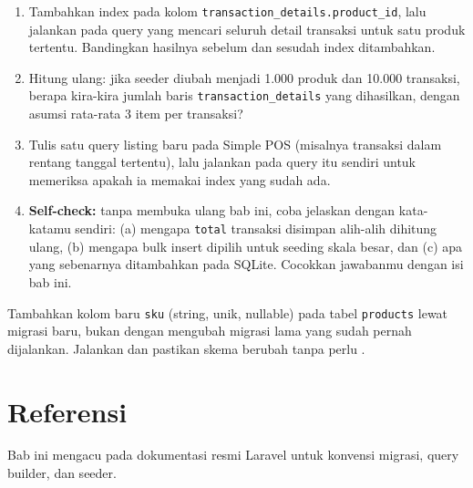 \begin{enumerate}
  \item Tambahkan index pada kolom \texttt{transaction\_details.product\_id},
    lalu jalankan  pada query yang mencari
    seluruh detail transaksi untuk satu produk tertentu. Bandingkan
    hasilnya sebelum dan sesudah index ditambahkan.
  \item Hitung ulang: jika seeder diubah menjadi 1.000 produk dan
    10.000 transaksi, berapa kira-kira jumlah baris
    \texttt{transaction\_details} yang dihasilkan, dengan asumsi
    rata-rata 3 item per transaksi?
  \item Tulis satu query listing baru pada Simple POS (misalnya
    transaksi dalam rentang tanggal tertentu), lalu jalankan
     pada query itu sendiri untuk memeriksa
    apakah ia memakai index yang sudah ada.
  \item \textbf{Self-check:} tanpa membuka ulang bab ini, coba jelaskan
    dengan kata-katamu sendiri: (a) mengapa \texttt{total} transaksi
    disimpan alih-alih dihitung ulang, (b) mengapa bulk insert dipilih
    untuk seeding skala besar, dan (c) apa yang sebenarnya ditambahkan
     pada SQLite. Cocokkan jawabanmu dengan isi bab
    ini.
\end{enumerate}

\begin{challengebox}
Tambahkan kolom baru \texttt{sku} (string, unik, nullable) pada tabel
\texttt{products} lewat migrasi baru, bukan dengan mengubah migrasi
lama yang sudah pernah dijalankan. Jalankan
 dan pastikan skema berubah tanpa perlu
.
\end{challengebox}

\section{Referensi}

Bab ini mengacu pada dokumentasi resmi Laravel \cite{laraveldocs} untuk
konvensi migrasi, query builder, dan seeder.
